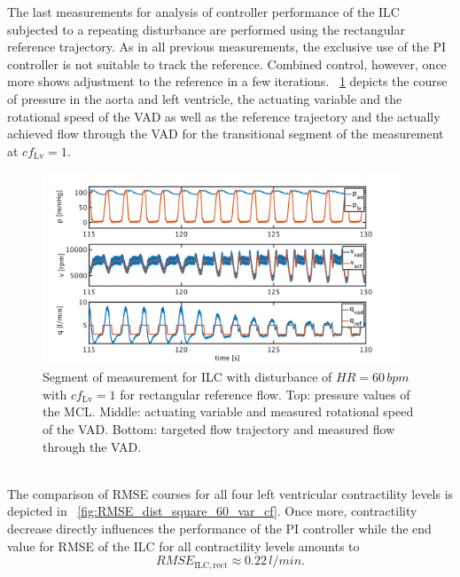 The last measurements for analysis of controller performance of the ILC subjected to a repeating disturbance are performed using the rectangular reference trajectory. As in all previous measurements, the exclusive use of the PI controller is not suitable to track the reference. Combined control, however, once more shows adjustment to the reference in a few iterations. \figurename~\ref{fig:pi_to_ilc_dist_square_60_cf1} depicts the course of pressure in the aorta and left ventricle, the actuating variable and the rotational speed of the VAD as well as the reference trajectory and the actually achieved flow through the VAD for the transitional segment of the measurement at $cf_{\mathrm{Lv}}=1$.
\begin{figure}[ht!]
  \centering
  \includegraphics[width=0.95\textwidth]{images/chapt_5/ILC/pi_to_ilc_dist_square_60_cf1.pdf}
  \caption[Segment of measurement for ILC with disturbance of $HR=60\,bpm$ with $cf_{\mathrm{Lv}}=1$ for rectangular reference flow]{Segment of measurement for ILC with disturbance of $HR=60\,bpm$ with $cf_{\mathrm{Lv}}=1$ for rectangular reference flow. Top:  pressure values of the MCL. Middle: actuating variable and measured rotational speed of the VAD. Bottom: targeted flow trajectory and measured flow through the VAD.}
  \label{fig:pi_to_ilc_dist_square_60_cf1}
\end{figure}
\\The comparison of RMSE courses for all four left ventricular contractility levels is depicted in \figurename~\ref{fig:RMSE_dist_square_60_var_cf}. Once more, contractility decrease directly influences the performance of the PI controller while the end value for RMSE of the ILC for all contractility levels amounts to
\begin{equation}
  RMSE_{\mathrm{ILC,rect}}\approx 0.22\,l/min.
\end{equation}
\newpage
